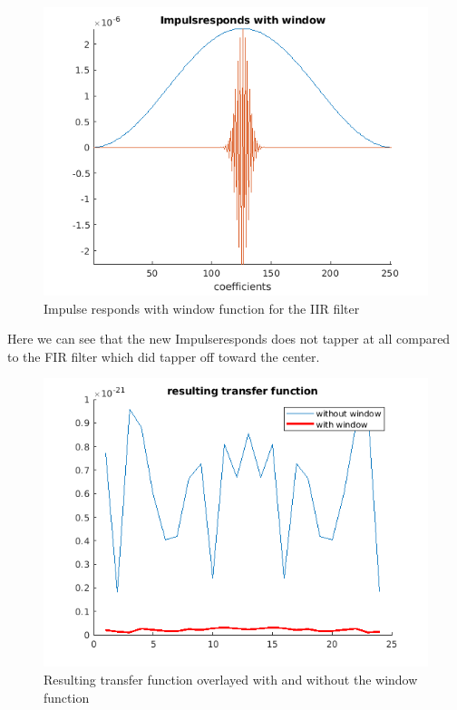 \begin{figure}[h]
  \centering
  \includegraphics[scale=0.60]{matlabStuff/IIR_responds_with_window.png}
  \caption{Impulse responds with window function for the IIR filter}%
  \label{fig:resultingTransferFuntionIIR}
\end{figure}

Here we can see that the new Impulseresponds does not 
tapper at all compared to the FIR filter which did 
tapper off toward the center.

\begin{figure}[h]
  \centering
  \includegraphics[scale=0.60]{matlabStuff/resulting_filter_function_IIR.png}
  \caption{Resulting transfer function overlayed with and without the window function}%
  \label{fig:resultingTransferFuntionIIR}
\end{figure}

